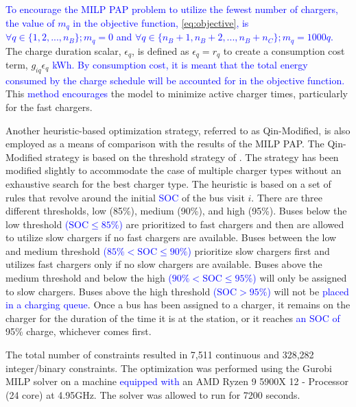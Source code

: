 \documentclass[utf8]{FrontiersinHarvard}
\let\cite\citep                                       %
\newcommand{\contvars}{7,511 }
\newcommand{\intvars}{328,282 }
\newcommand{\timeran}{7200 }                                                    %
\begin{document}
\textcolor{blue}{To encourage the MILP PAP problem to utilize the fewest number of chargers, the value of $m_q$ in the objective function, {\autoref{eq:objective}}, is $\forall q \in \{1,2,..., n_B \}; m_q = 0$ and $\forall q \in \{n_B + 1, n_B + 2,..., n_B + n_C \}; m_q = 1000q$.} The charge duration scalar, \(\epsilon_q\), is defined as \(\epsilon_q = r_q\) to create a
consumption cost term, \(g_{iq}\epsilon_q\) \textcolor{blue}{kWh. By consumption cost, it is meant that the total energy consumed by the charge schedule will be accounted for in the objective function.} This
\textcolor{blue}{method encourages} the model to minimize active charger times, particularly for the fast
chargers.

Another heuristic-based optimization strategy, referred to as Qin-Modified, is also employed as a means of comparison
with the results of the MILP PAP. The Qin-Modified strategy is based on the threshold strategy of
\cite{qin-2016-numer-analy}. The strategy has been modified slightly to accommodate the case of multiple charger types
without an exhaustive search for the best charger type. The heuristic is based on a set of rules that revolve around the
initial \textcolor{blue}{SOC} of the bus visit \(i\). There are three different thresholds,
low (85\%), medium (90\%), and high (95\%). Buses below the low threshold \textcolor{blue}{($\text{SOC} \le 85\%$)} are prioritized to fast chargers and then are allowed to utilize slow chargers if no fast chargers are
available. Buses between the low and medium threshold \textcolor{blue}{($85\% < \text{SOC} \le 90\%$)}
prioritize slow chargers first and utilizes fast chargers only if no slow chargers are available. Buses above the medium
threshold and below the high \textcolor{blue}{($90\% < \text{SOC} \le 95\%$)} will only be assigned to slow
chargers. Buses above the high threshold \textcolor{blue}{($\text{SOC} > 95\%$)} will not be
\textcolor{blue}{placed in a charging queue}. Once a bus has been assigned to a charger, it remains on the
charger for the duration of the time it is at the station, or it reaches \textcolor{blue}{an SOC of} 95\%
charge, whichever comes first.

The total number of constraints resulted in \contvars continuous and \intvars integer/binary constraints. The
optimization was performed using the Gurobi MILP solver \cite{gurobi-2021-gurob-optim} on a machine
\textcolor{blue}{equipped with} an AMD Ryzen 9 5900X 12 - Processor (24 core) at 4.95GHz. The solver was
allowed to run for \timeran seconds.
\end{document}
